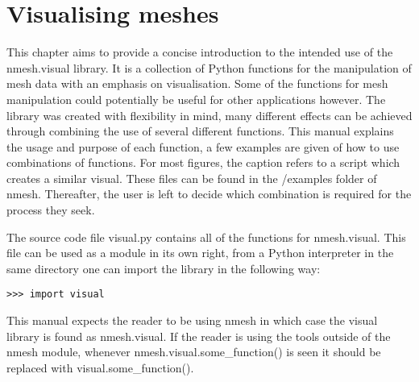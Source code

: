 %        
%
%
%
%
%
%
%
%
%
%
%
%
%
%
%
%
%
%
%
\chapter{Visualising meshes \label{chapter:visual}}

This chapter aims to provide a concise introduction to the intended use of the {\ttfamily nmesh.visual} library. It is a collection of Python functions for the manipulation of mesh data with an emphasis on visualisation. Some of the functions for mesh manipulation could potentially be useful for other applications however. The library was created with flexibility in mind, many different effects can be achieved through combining the use of several different functions. This manual explains the usage and purpose of each function, a few examples are given of how to use combinations of functions. For most figures, the caption refers to a script which creates a similar visual. These files can be found in the {\ttfamily /examples} folder of {\ttfamily nmesh}. Thereafter, the user is left to decide which combination is required for the process they seek. 

The source code file {\ttfamily visual.py} contains all of the functions for {\ttfamily nmesh.visual}. This file can be used as a module in its own right, from a Python interpreter in the same directory one can import the library in the following way:
\begin{lstlisting}
>>> import visual
\end{lstlisting}
This manual expects the reader to be using {\ttfamily nmesh} in which case the visual library is found as {\ttfamily nmesh.visual}. If the reader is using the tools outside of the {\ttfamily nmesh} module, whenever {\ttfamily nmesh.visual.some\_function()} is seen it should be replaced with {\ttfamily visual.some\_function()}.

